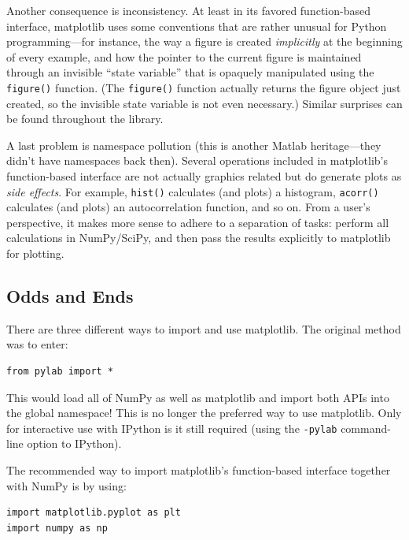 Another consequence is inconsistency. At least in its favored
function-based interface, matplotlib uses some conventions that are
rather unusual for Python programming---for instance, the way a figure
is created \emph{implicitly} at the beginning of every example, and
how the pointer to the current figure is maintained through an
invisible ``state variable'' that is opaquely manipulated using the
\texttt{figure()} function. (The \texttt{figure()} function actually
returns the figure object just created, so the invisible state
variable is not even necessary.) Similar surprises can be found
throughout the library.

A last problem is namespace pollution (this is another Matlab
heritage---they didn't have namespaces back then).  Several
operations included in matplotlib's function-based interface are not
actually graphics related but do generate plots as \emph{side
  effects}. For example, \texttt{hist()} calculates (and plots) a
histogram, \texttt{acorr()} calculates (and plots) an autocorrelation
function, and so on. From a user's perspective, it makes more sense to
adhere to a separation of tasks: perform all calculations in
NumPy/SciPy, and then pass the results explicitly to matplotlib for
plotting.

\subsection{Odds and Ends}

There are three different ways to import and use matplotlib. The 
original method was to enter:

\begin{verbatim}
from pylab import *
\end{verbatim}

This would load all of NumPy as well as matplotlib and import both
APIs into the global namespace! This is no longer the preferred way to
use matplotlib. Only for interactive use with IPython is it still
required (using the \texttt{-pylab} command-line option to IPython).

The recommended way to import matplotlib's function-based interface
together with NumPy is by using:

\begin{verbatim}
import matplotlib.pyplot as plt
import numpy as np
\end{verbatim}

